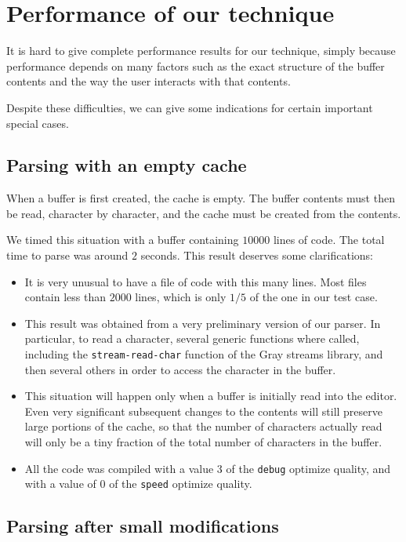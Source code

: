 \section{Performance of our technique}

It is hard to give complete performance results for our technique,
simply because performance depends on many factors such as the exact
structure of the buffer contents and the way the user interacts with
that contents.

Despite these difficulties, we can give some indications for certain
important special cases.

\subsection{Parsing with an empty cache}

When a buffer is first created, the cache is empty.  The buffer
contents must then be read, character by character, and the cache must
be created from the contents.

We timed this situation with a buffer containing $10000$ lines of
\commonlisp{} code.  The total time to parse was around $2$ seconds.
This result deserves some clarifications:

\begin{itemize}
\item It is very unusual to have a file of \commonlisp{} code with
  this many lines.  Most files contain less than $2000$ lines, which
  is only $1/5$ of the one in our test case.
\item This result was obtained from a very preliminary version of our
  parser.  In particular, to read a character, several generic
  functions where called, including the \texttt{stream-read-char}
  function of the Gray streams library, and then several others in
  order to access the character in the buffer.
\item This situation will happen only when a buffer is initially read
  into the editor.  Even very significant subsequent changes to the
  contents will still preserve large portions of the cache, so that
  the number of characters actually read will only be a tiny fraction
  of the total number of characters in the buffer.
\item All the code was compiled with a value $3$ of the \texttt{debug}
  optimize quality, and with a value of $0$ of the \texttt{speed}
  optimize quality.
\end{itemize}

\subsection{Parsing after small modifications}

